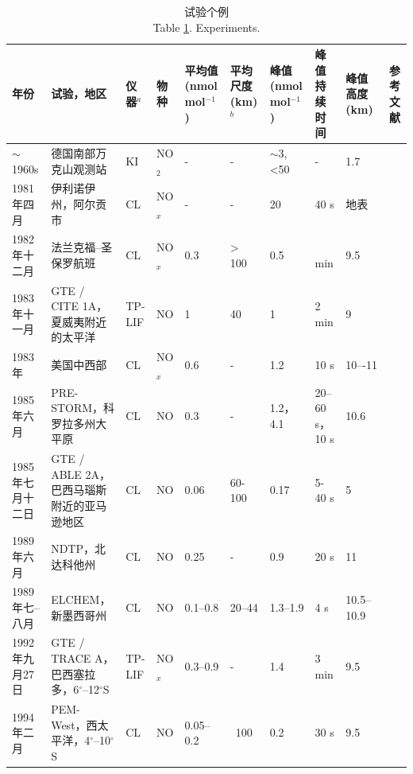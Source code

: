 {
\centering
\scriptsize
\begin{longtable}
{|p{3em}|p{5.2em}|p{3.1em}|p{1.6em}|p{3em}|p{4em}|p{3.5em}|p{4em}|p{4em}|p{8em}|}
\caption{试验个例\\
Table \ref{table:NO/NOx}. Experiments.}
\label{table:NO/NOx} \\
\hline
年份 & 试验，地区  & 仪器$^a$  & 物种 & 平均值 (nmol mol$^{−1}$) &
平均尺度 (km) $^b$  &  峰值 \newline(nmol mol$^{−1}$)  &  峰值 \newline 持续时间  & 峰值高度(km) &   参考文献 \\ \hline
$\sim$1960s & 德国南部万克山观测站              & KI     & NO$_2$ & -   &  -    &  $\sim$3, <50  & -    & 1.7   &  \citet{Reiter.1970} \\ \hline
1981年四月   & 伊利诺伊州，阿尔贡市              & CL     & NO$_x$ & -   &  -    &  20            & 40 s  & 地表  &  \citet{Drapcho.1983} \\ \hline
1982年十二月 & 法兰克福–圣保罗航班               & CL     & NO$_x$ & 0.3 & > 100 &  0.5           & ~ min &  9.5 & \citet{Dickerson.1984} \\ \hline
1983年十一月 & GTE / CITE 1A，夏威夷附近的太平洋 & TP-LIF & NO  & 1    & 40    &   1            & 2 min & 9    & \citet{Chameides.1987,Davis.1987} \\ \hline
1983年      & 美国中西部                       & CL     & NO$_x$ & 0.6 & -     & 1.2            & 10 s  & 10–-11 & \citet{Dickerson.1987} \\ \hline
1985年六月   & PRE-STORM，科罗拉多州大平原       & CL     & NO  & 0.3 & -     & 1.2，4.1       & 20--60 s， 10 s &  10.6  &  \citet{Luke.1992} \\ \hline
1985年七月十二日  & GTE / ABLE 2A，巴西马瑙斯附近的亚马逊地区 & CL  & NO  & 0.06 & 60-100 & 0.17  & 5-40 s & 5  & \citet{Torres.1988} \\ \hline
1989年六月   & NDTP，北达科他州                 & CL     & NO  & 0.25  & -   & 0.9            & 20 s   &  11  & \citet{Poulida.1996} \\ \hline
1989年七--八月 &  ELCHEM，新墨西哥州            & CL      & NO  & 0.1--0.8 & 20--44  & 1.3--1.9 & 4 s  & 10.5--10.9   & \citet{Ridley.1996} \\ \hline
1992年九月27日  & GTE / TRACE A，巴西塞拉多，6$^{\circ}$--12$^{\circ}$S & TP-LIF & NO$_x$ & 0.3--0.9 & - &  1.4 & 3 min  & 9.5 & \citet{Pickering.1996} \\ \hline
1994年二月    & PEM-West，西太平洋，4$^{\circ}$--10$^{\circ}$S & CL  &  NO  & 0.05--0.2 &~100 & 0.2 & 30 s  &  9.5 & \citet{Kawakami.1997} \\ \hline

\end{longtable}}
